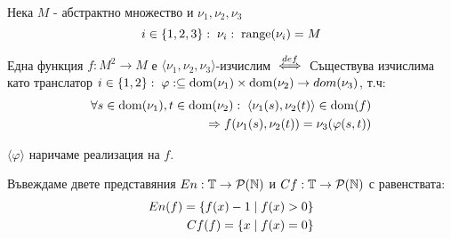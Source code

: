 \begin{definition}
    Нека $M$ - абстрактно множество и $\nu_1, \nu_2, \nu_3$
    \begin{equation}
        i\in\{1, 2, 3\}:\; \nu_i:\; \operatorname*{range}(\nu_i) = M
    \end{equation}

    Една функция $f : M^2 \to M$ е $\langle \nu_1, \nu_2, \nu_3 \rangle$-изчислим ${\overset{def}{\iff}}$ Съществува изчислима като транслатор $i\in\left\{1, 2\right\}:\; \varphi : \subseteq \operatorname*{dom}(\nu_1) \times \operatorname*{dom}(\nu_2) \to dom(\nu_3)$, т.ч:
    \begin{equation}
        \begin{split}
            \forall s \in \operatorname*{dom}(\nu_1), t \in \operatorname*{dom}(\nu_2):\; \langle \nu_1(s), \nu_2(t) \rangle\in \operatorname*{dom}(f) \\
            \Rightarrow f(\nu_1(s), \nu_2(t)) = \nu_3(\varphi(s, t))
        \end{split}
    \end{equation}
\end{definition}
\begin{notation}
    $\langle \varphi \rangle$ наричаме реализация на $f$.
\end{notation}

\begin{definition}
    Въвеждаме двете представяния $En : \mathbb T \to \mathcal P({\mathbb{N}})$ и $Cf : \mathbb T \to \mathcal P({\mathbb{N}})$ с равенствата:
    \begin{equation}
        \begin{split}
            En(f) = \left\{f(x) - 1 \mid f(x) > 0\right\} \\
            Cf(f) = \left\{x \mid f(x) = 0\right\}        \\
        \end{split}
    \end{equation}
\end{definition}

